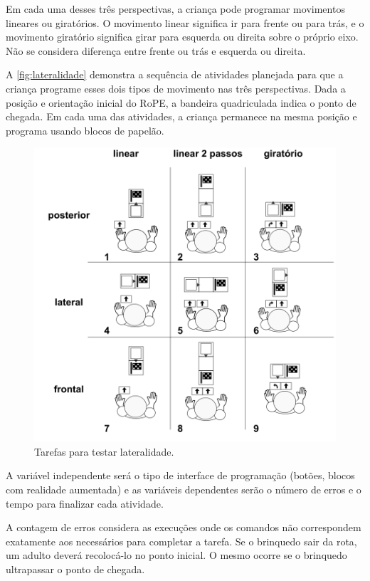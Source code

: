 Em cada uma desses três perspectivas, a criança pode programar movimentos lineares ou giratórios. O movimento linear significa ir para frente ou para trás, e o movimento giratório significa girar para esquerda ou direita sobre o próprio eixo. Não se considera diferença entre frente ou trás e esquerda ou direita.

A \autoref{fig:lateralidade} demonstra a sequência de atividades planejada para que a criança programe esses dois tipos de movimento nas três perspectivas. Dada a posição e orientação inicial do RoPE, a bandeira quadriculada indica o ponto de chegada. Em cada uma das atividades, a criança permanece na mesma posição e programa usando blocos de papelão.

\begin{figure}[!hbt]
    \centering
    \includegraphics[width=.9\textwidth,fbox]{figs/lateralidade.png}
    \caption{Tarefas para testar lateralidade.}
    \sourceauthor
    \label{fig:lateralidade}
\end{figure}

A variável independente será o tipo de interface de programação (botões, blocos com realidade aumentada) e as variáveis dependentes serão o número de erros e o tempo para finalizar cada atividade.  

A contagem de erros considera as execuções onde os comandos não correspondem exatamente aos necessários para completar a tarefa. Se o brinquedo sair da rota, um adulto deverá recolocá-lo no ponto inicial. O mesmo ocorre se o brinquedo ultrapassar o ponto de chegada.

